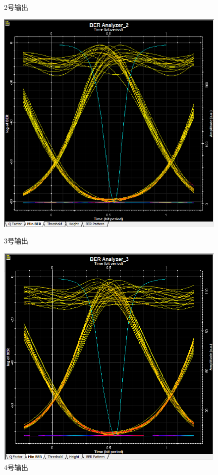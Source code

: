 \documentclass[12pt, a4paper, oneside]{article}
\begin{document}
\begin{spacing}{2.0}
\begin{figure}[H]
\begin{minipage}[t]{0.5\linewidth}
        \caption{2号输出}
        \label{fig:side:b}
      \end{minipage}
	  \begin{minipage}[t]{0.5\linewidth}
        \centering
        \includegraphics[scale=0.5]{sweep2BER3.png}
        \caption{3号输出}
        \label{fig:side:a}
      \end{minipage}%
      \begin{minipage}[t]{0.5\linewidth}
        \centering
        \includegraphics[scale=0.5]{sweep2BER4.png}
        \caption{4号输出}
        \label{fig:side:b}
      \end{minipage}
\end{figure}


\end{spacing}
\end{document}
